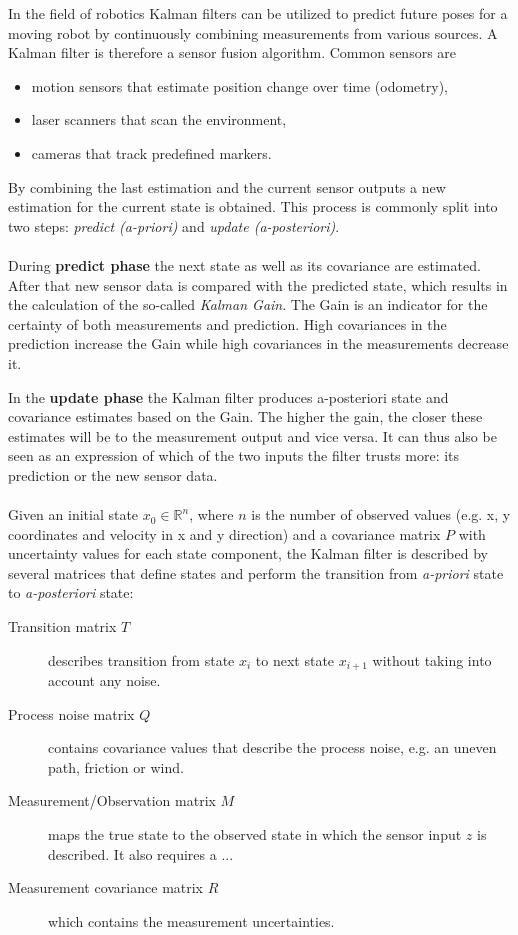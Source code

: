 In the field of robotics Kalman filters can be utilized to predict future poses for a moving robot by continuously combining measurements from various sources. A Kalman filter is therefore a sensor fusion algorithm. Common sensors are
 
\begin{itemize}
\item motion sensors that estimate position change over time (odometry),
\item laser scanners that scan the environment,
\item cameras that track predefined markers. 
\end{itemize}

By combining the last estimation and the current sensor outputs a new estimation for the current state is obtained. This process is commonly split into two steps: \textit{predict (a-priori)} and \textit{update (a-posteriori)}.
\\\\
During \textbf{predict phase} the next state as well as its covariance are estimated. After that new sensor data is compared with the predicted state, which results in the calculation of the so-called  \textit{Kalman Gain}. The Gain is an indicator for the certainty of both measurements and prediction. High covariances in the prediction increase the Gain while high covariances in the measurements decrease it.

In the \textbf{update phase} the Kalman filter produces a-posteriori state and covariance estimates based on the Gain. The higher the gain, the closer these estimates will be to the measurement output and vice versa. It can thus also be seen as an expression of which of the two inputs the filter trusts more: its prediction or the new sensor data.
\\\\
Given an initial state $x_0\in \mathbb{R}^n$, where $n$ is the number of observed values (e.g. x, y coordinates and velocity in x and y direction) and a covariance matrix $P$ with uncertainty values for each state component, the Kalman filter is described by several matrices that define states and perform the transition from \textit{a-priori} state to \textit{a-posteriori} state:
\begin{description}
\item[Transition matrix $T$] describes transition from state $x_i$ to next state $x_{i+1}$ without taking into account any noise.
\item[Process noise matrix $Q$] contains covariance values that describe the process noise, e.g. an uneven path, friction or wind.
\item[Measurement/Observation matrix $M$] maps the true state to the observed state in which the sensor input $z$ is described. It also requires a ...
\item[Measurement covariance matrix $R$] which contains the measurement uncertainties.
\end{description}


